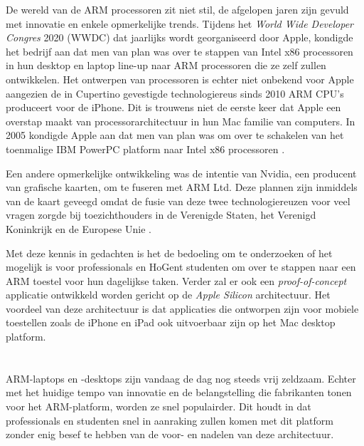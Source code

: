 De wereld van de ARM processoren zit niet stil, de afgelopen jaren zijn gevuld met innovatie en enkele opmerkelijke trends. Tijdens het \textit{World Wide Developer Congres} 2020 (WWDC) dat jaarlijks wordt georganiseerd door Apple, kondigde het bedrijf aan dat men van plan was over te stappen van Intel x86 processoren in hun desktop en laptop line-up naar ARM processoren die ze zelf zullen ontwikkelen. Het ontwerpen van processoren is echter niet onbekend voor Apple aangezien de in Cupertino gevestigde technologiereus sinds 2010 ARM CPU’s produceert voor de iPhone. Dit is trouwens niet de eerste keer dat Apple een overstap maakt van processorarchitectuur in hun Mac familie van computers. In 2005 kondigde Apple aan dat men van plan was om over te schakelen van het toenmalige IBM PowerPC platform naar Intel x86 processoren \autocite{Fulton2020}. 

Een andere opmerkelijke ontwikkeling was de intentie van Nvidia, een producent van grafische kaarten, om te fuseren met ARM Ltd. Deze plannen zijn inmiddels van de kaart geveegd omdat de fusie van deze twee technologiereuzen voor veel vragen zorgde bij toezichthouders in de Verenigde Staten, het Verenigd Koninkrijk en de Europese Unie \autocite{Dowd2022}. 

Met deze kennis in gedachten is het de bedoeling om te onderzoeken of het mogelijk is voor professionals en HoGent studenten om over te stappen naar een ARM toestel voor hun dagelijkse taken. Verder zal er ook een \textit{proof-of-concept} applicatie ontwikkeld worden gericht op de \textit{Apple Silicon} architectuur. Het voordeel van deze architectuur is dat applicaties die ontworpen zijn voor mobiele toestellen zoals de iPhone en iPad ook uitvoerbaar zijn op het Mac desktop platform.

\section{}
\label{sec:probleemstelling}

ARM-laptops en -desktops zijn vandaag de dag nog steeds vrij zeldzaam. Echter met het huidige tempo van innovatie en de belangstelling die fabrikanten tonen voor het ARM-platform, worden ze snel populairder. Dit houdt in dat professionals en studenten snel in aanraking zullen komen met dit platform zonder enig besef te hebben van de voor- en nadelen van deze architectuur. 

\section{}
\label{sec:onderzoeksvraag}

